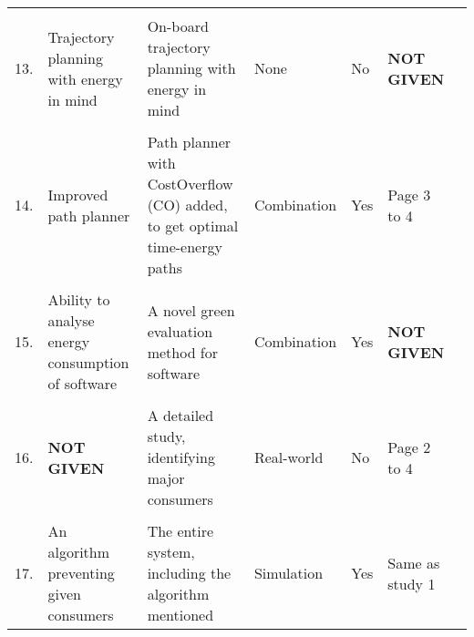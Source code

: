 \begin{table}[h]
\begin{tabular}{p{0.1cm}p{5cm}p{3cm}p{2cm}p{2cm}p{4cm}p{5cm}}
            \hline
            \\
            {13.} &
                {Trajectory planning with energy in mind} &
                {On-board trajectory planning with energy in mind} &
                {None} &
                {No} &
                {\textbf{NOT GIVEN}} \\
            \hline
            \\
            {14.} &
                {Improved path planner} &
                {Path planner with CostOverflow (CO) added, to get optimal time-energy paths} &
                {Combination} &
                {Yes} &
                {Page 3 to 4} \\
            \hline
            \\
            {15.} &
                {Ability to analyse energy consumption of software} &
                {A novel green evaluation method for software} &
                {Combination} &
                {Yes} &
                {\textbf{NOT GIVEN}} \\
            \hline
            \\
            {16.}  &
                {\textbf{NOT GIVEN}} &
                {A detailed study, identifying major consumers} &
                {Real-world} &
                {No} &
                {Page 2 to 4} \\
            \hline
            \\
            {17.}  &
                {An algorithm preventing given consumers} &
                {The entire system, including the algorithm mentioned} &
                {Simulation} &
                {Yes} &
                {Same as study 1} \\
        \bottomrule
    \end{tabular}
    \label{table:data_sheet_part_2}
\end{table}